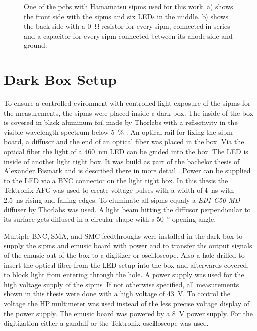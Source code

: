 \begin{figure}
\begin{subfigure}[b]{0.48\textwidth}
		\caption{}
		\label{}
	\end{subfigure}
	\caption[\ac{pcb} with Hamamatsu \acp{sipm}]{One of the \acp{pcb} with Hamamatsu \acp{sipm} used for this work. a) shows the front side with the \acp{sipm} and six LEDs in the middle. b) shows the back side with a \SI{0}{\ohm} resistor for every \ac{sipm}, connected in series and a capacitor for every \ac{sipm} connected between its anode side and ground.}
	\label{fig:sipm_pcb}
\end{figure}

\section{Dark Box Setup}
To ensure a controlled evironment with controlled light exposure of the \acp{sipm} for the measurements, the \acp{sipm} were placed inside a dark box.
The inside of the box is covered in black aluminum foil made by Thorlabs with a reflectivity in the visible wavelength spectrum below \SI{5}{\percent} \cite{BKF12}.
An optical rail for fixing the \ac{sipm} board, a diffusor and the end of an optical fiber was placed in the box.
Via the optical fiber the light of a \SI{460}{\nano\meter} LED can be guided into the box.
The LED is inside of another light tight box.
It was build as part of the bachelor thesis of Alexander Bismark and is described there in more detail \cite{Bismark}.
Power can be supplied to the LED via a BNC connector on the light tight box.
In this thesis the Tektronix AFG was used to create voltage pulses with a width of \SI{4}{\nano\second} with \SI{2.5}{\nano\second} rising and falling edges.
To eluminate all \acp{sipm} equaly a \textit{ED1-C50-MD} diffuser by Thorlabs was used.
A light beam hitting the diffusor perpendicular to its surface gets diffused in a circular shape with a \SI{50}{\degree} opening angle.

Multiple BNC, SMA, and SMC feedthroughs were installed in the dark box to supply the \acp{sipm} and \ac{emusic} board with power and to transfer the output signals of the \ac{emusic} out of the box to a digitizer or oscilloscope.
Also a hole drilled to insert the optical fiber from the LED setup into the box and afterwards covered, to block light from entering through the hole.
A power supply was used for the high voltage supply of the \acp{sipm}.
If not otherwise specified, all measurements shown in this thesis were done with a high voltage of \SI{43}{\volt}.
To control the voltage the HP multimeter was used instead of the less precise voltage display of the power supply.
The \ac{emusic} board was powered by a \SI{8}{\volt} power supply.
For the digitization either a \ac{gandalf} or the Tektronix oscilloscope was used.

